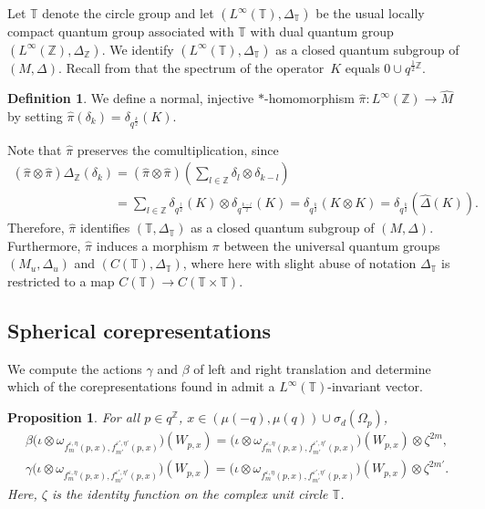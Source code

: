 \documentclass[pdftex]{sigma}
\numberwithin{equation}{section}
\newtheorem{prop}[thm]{Proposition}
\theoremstyle{definition}
\newtheorem{dfn}[thm]{Definition}
\newcommand{\ep}{\varepsilon}
\begin{document}
Let $\mathbb{T}$ denote the circle group and let $(L^\infty (\mathbb{T}), \Delta_{\mathbb{T}})$ be the usual locally compact quantum group associated with $\mathbb{T}$ with dual quantum group $(L^\infty(\mathbb{Z}), \Delta_{\mathbb{Z}})$. We identify $(L^\infty (\mathbb{T}), \Delta_{\mathbb{T}})$ as a closed quantum subgroup of $(M, \Delta)$. Recall from \cite[Def\/inition~4.3]{GroKoeKus} that the spectrum of the opera\-tor~$K$  equals $0 \cup q^{\frac{1}{2}\mathbb{Z}}$.
\begin{dfn}\label{DfnPiHat}
 We def\/ine a normal, injective $\ast$-homomorphism $\hat{\pi}: L^\infty(\mathbb{Z}) \rightarrow \hat{M}$ by setting $\hat{\pi}(\delta_k) = \delta_{q^{\frac{k}{2}}}(K)$.
\end{dfn}

Note that $\hat{\pi}$ preserves the comultiplication, since
\begin{gather*}
  (\hat{\pi} \otimes \hat{\pi}) \Delta_{\mathbb{Z}}(\delta_k)  =  (\hat{\pi} \otimes \hat{\pi}) \left( \sum_{l \in \mathbb{Z}} \delta_l \otimes \delta_{k - l} \right) \\
\phantom{(\hat{\pi} \otimes \hat{\pi}) \Delta_{\mathbb{Z}}(\delta_k)}{}
 =   \sum_{l \in \mathbb{Z}} \delta_{q^{\frac{l}{2}}}(K) \otimes \delta_{q^{\frac{k-l}{2}}}(K) =  \delta_{q^{\frac{k}{2}}}(K \otimes K) =  \delta_{q^{\frac{k}{2}}}(\hat{\Delta}(K)).
\end{gather*}
Therefore, $\hat{\pi}$ identif\/ies $(\mathbb{T}, \Delta_{\mathbb{T}})$ as a closed quantum subgroup of $(M, \Delta)$.
Furthermore, $\hat{\pi}$ induces a morphism $\pi$ between the universal quantum groups $(M_u, \Delta_u)$ and $(C(\mathbb{T}), \Delta_{\mathbb{T}})$, where  here with slight abuse of notation $\Delta_{\mathbb{T}}$ is restricted to a map $C(\mathbb{T}) \rightarrow C(\mathbb{T} \times \mathbb{T})$.

\subsection*{Spherical corepresentations}

We compute the actions $\gamma$ and $\beta$ of left and right translation and determine which of the corepresentations found in \cite{GroKoeKus} admit a $L^\infty(\mathbb{T})$-invariant vector.

\begin{prop}\label{PropActions}
For all $p \in q^{\mathbb{Z}}$, $x \in (\mu(-q),\mu(q)) \cup \sigma_d(\Omega_p)$,
 \begin{gather}
\beta\big(\iota \otimes \omega_{ f_m^{\ep,\eta}(p,x), f_{m'}^{\ep',\eta'} (p,x)}\big)(W_{p,x})   =
\big(\iota \otimes \omega_{ f_m^{\ep,\eta}(p,x), f_{m'}^{\ep',\eta'} (p,x)}\big)(W_{p,x}) \otimes \zeta^{2m}, \label{EqnBetaAction} \\
\gamma \big(\iota \otimes \omega_{ f_m^{\ep,\eta}(p,x), f_{m'}^{\ep',\eta'} (p,x)}\big)(W_{p,x})   =
\big(\iota \otimes \omega_{ f_m^{\ep,\eta}(p,x), f_{m'}^{\ep',\eta'} (p,x)}\big)(W_{p,x}) \otimes \zeta^{2m'}. \label{EqnGammaAction}
\end{gather}
Here, $\zeta$ is the identity function on the complex unit circle $\mathbb{T}$.
\end{prop}
\end{document}

